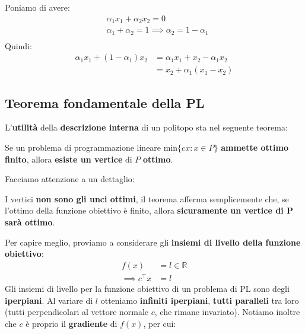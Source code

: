 \begin{exa}
    Poniamo di avere:
    \[
        \begin{aligned}
            &\alpha_{1}x_{1} + \alpha_{2}x_{2} = 0 \\ 
            &\alpha_{1} + \alpha_{2} = 1 \implies \alpha_{2} = 1-\alpha_{1} \\ 
        \end{aligned}
    \] 
    Quindi:
    \[
        \begin{aligned}
            \alpha_{1}x_{1} + (1-\alpha_{1})x_{2} &= \alpha_{1}x_{1} + x_{2} -\alpha_{1}x_{2} \\ 
                                                  &= x_{2} + \alpha_{1}(x_{1}-x_{2})
        \end{aligned}
    \] 
\end{exa}

\subsection{Teorema fondamentale della PL}

L'\textbf{utilità} della \textbf{descrizione interna} di un politopo sta nel
seguente teorema:

\begin{theorem}
    Se un problema di programmazione lineare $\text{min}\{cx : x\in P\}$ \textbf{ammette
    ottimo finito}, allora \textbf{esiste un vertice} di $P$ \textbf{ottimo}.
\end{theorem}

Facciamo attenzione a un dettaglio:

\begin{warn}
    I vertici \textbf{non sono gli unci ottimi}, il teorema afferma semplicemente
    che, se l'ottimo della funzione obiettivo è finito, allora \textbf{sicuramente
    un vertice di P sarà ottimo}.
\end{warn}

Per capire meglio, proviamo a considerare gli \textbf{insiemi di livello della funzione
obiettivo}:
\[
    \begin{aligned}
        f(x) &= l \in \mathbb{R} \\ 
        \implies c^\top x &= l
    \end{aligned}
\]
Gli insiemi di livello per la funzione obiettivo di un problema di PL sono degli \textbf{iperpiani}.
Al variare di $l$ otteniamo \textbf{infiniti iperpiani}, \textbf{tutti paralleli}
tra loro (tutti perpendicolari al vettore normale $c$, che rimane invariato).
Notiamo inoltre che $c$ è proprio il \textbf{gradiente} di $f(x)$, per cui:


